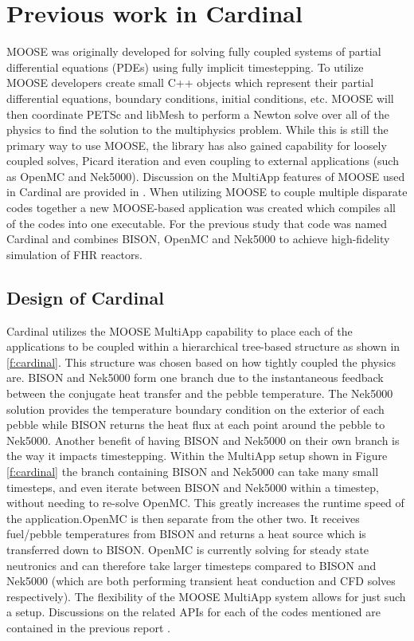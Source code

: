 \section{Previous work in Cardinal}
\label{s:cardinal}

MOOSE was originally developed for solving fully coupled systems of partial differential equations (PDEs) using fully implicit timestepping. To utilize MOOSE developers create small C++ objects which represent their partial differential equations, boundary conditions, initial conditions, etc. MOOSE will then coordinate PETSc and libMesh to perform a Newton solve over all of the physics to find the solution to the multiphysics problem. While this is still the primary way to use MOOSE, the library has also gained capability for loosely coupled solves, Picard iteration and even coupling to external applications (such as OpenMC and Nek5000). Discussion on the MultiApp features of MOOSE used in Cardinal are provided in \cite{cardinal}. When utilizing MOOSE to couple multiple disparate codes together a new MOOSE-based application was created \cite{cardinal}  which compiles all of the codes into one executable. For the previous study that code was  named Cardinal and combines BISON, OpenMC and Nek5000 to achieve high-fidelity simulation of FHR reactors.

\subsection{Design of Cardinal}
\label{ss:c1}

Cardinal utilizes the MOOSE MultiApp capability to place each of the applications to be coupled within a hierarchical tree-based structure as shown in \ref{f:cardinal}. This structure was chosen based on how tightly coupled the physics are. BISON and Nek5000 form one branch due to the instantaneous feedback between the conjugate heat transfer and the pebble temperature. The Nek5000 solution provides the temperature boundary condition on the exterior of each pebble while BISON returns the heat  flux at each point around the pebble to Nek5000. Another benefit of having BISON and Nek5000 on their own branch is the way it impacts timestepping. Within the MultiApp setup shown in Figure \ref{f:cardinal} the branch containing BISON and Nek5000 can take many small timesteps, and even iterate between BISON and Nek5000 within a timestep, without needing to re-solve OpenMC. This greatly increases the runtime speed of the application.OpenMC is then separate from the other two. It receives fuel/pebble temperatures from BISON and returns a heat source which is transferred down to BISON. OpenMC is currently solving for steady state neutronics and can therefore take larger timesteps compared to BISON and Nek5000 (which are both performing transient heat conduction and CFD solves respectively). The flexibility of the MOOSE MultiApp system allows for just such a setup. Discussions on the related APIs for each of the codes mentioned are contained in the previous report \cite{cardinal}.

